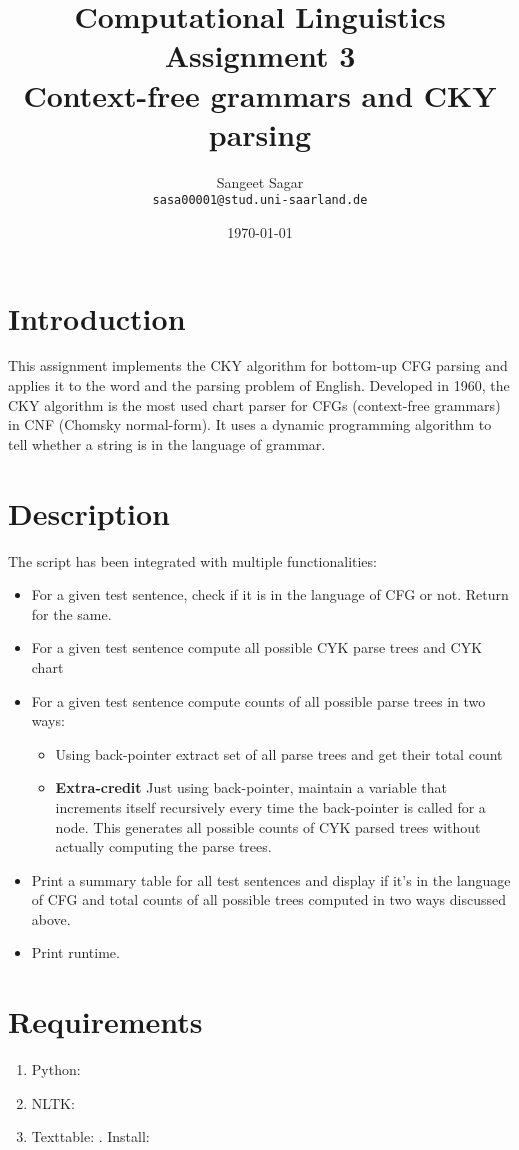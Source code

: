 \documentclass{article}[a4paper]
\title{\textbf{Computational Linguistics} \\
Assignment 3\\
Context-free grammars and CKY parsing 
}
\author{Sangeet Sagar\\
            \texttt{sasa00001@stud.uni-saarland.de}
}
\date{\today}
\begin{document}
\maketitle
\section{Introduction}
This assignment implements the CKY algorithm for bottom-up CFG parsing and applies it to the word and the parsing problem of English. Developed in 1960, the CKY algorithm is the most used chart parser for CFGs (context-free grammars) in CNF (Chomsky normal-form). It uses a dynamic programming algorithm to tell whether a string is in the language of grammar.

\section{Description}
The script has been integrated with multiple functionalities: 
\begin{itemize}
    \item For a given test sentence, check if it is in the language of CFG or not. Return  for the same.
    \item For a given test sentence compute all possible CYK parse trees and CYK chart
    \item For a given test sentence compute counts of all possible parse trees in two ways:
    \begin{itemize}
        \item Using back-pointer extract set of all parse trees and get their total count
        \item \textbf{Extra-credit} Just using back-pointer, maintain a  variable that increments itself recursively every time the back-pointer is called for a node. This generates all possible counts of CYK parsed trees without actually computing the parse trees.
    \end{itemize}
    \item Print a summary table for all test sentences and display if it's in the language of CFG and total counts of all possible trees computed in two ways discussed above.
    \item Print runtime.
    
\end{itemize}

\section{Requirements}
\begin{enumerate}
    \item Python: 
    \item NLTK: 
    \item Texttable: . Install: 
\end{enumerate}
\end{document}

